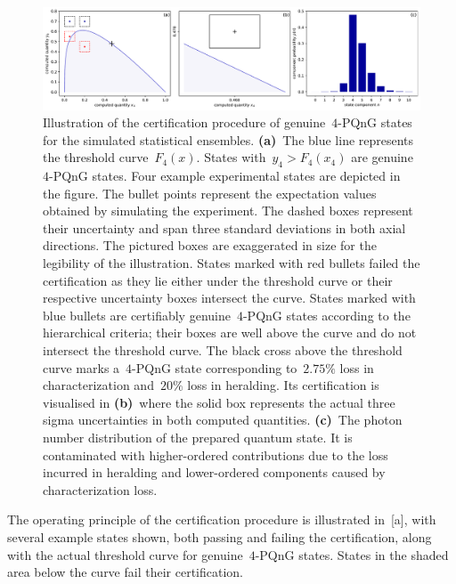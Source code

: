 \documentclass{article}
\begin{document}
\begin{figure}[h]
  \bgroup
    \hspace*{-0.125\columnwidth}%
    \includegraphics[width = 1.25 \columnwidth]{import/illustrate_process.pdf}
  \egroup
  \caption{
    Illustration of the certification procedure of genuine~$4$-PQnG states for the simulated statistical ensembles. \textbf{(a)}~The blue line represents the threshold curve~$F_{4} (x)$. States with~$y_{4} > F_{4}(x_{4})$ are genuine~$4$-PQnG states. Four example experimental states are depicted in the figure. The bullet points represent the expectation values obtained by simulating the experiment. The dashed boxes represent their uncertainty and span three standard deviations in both axial directions. The pictured boxes are exaggerated in size for the legibility of the illustration. States marked with red bullets failed the certification as they lie either under the threshold curve or their respective uncertainty boxes intersect the curve. States marked with blue bullets are certifiably genuine~$4$-PQnG states according to the hierarchical criteria; their boxes are well above the curve and do not intersect the threshold curve. The black cross above the threshold curve marks a~$4$-PQnG state corresponding to~$2.75\%$ loss in characterization and~$20\%$ loss in heralding. Its certification is visualised in \textbf{(b)}~where the solid box represents the actual three sigma uncertainties in both computed quantities. \textbf{(c)}~The photon number distribution of the prepared quantum state. It is contaminated with higher-ordered contributions due to the loss incurred in heralding and lower-ordered components caused by characterization loss.
  }
  \label{f-il}
\end{figure}

The operating principle of the certification procedure is illustrated in~[a], with several example states shown, both passing and failing the certification, along with the actual threshold curve for genuine~$4$-PQnG states. States in the shaded area below the curve fail their certification.
\end{document}

